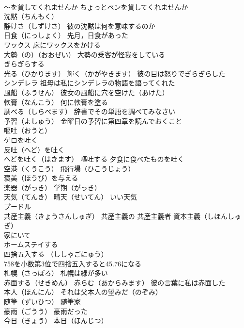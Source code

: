\documentclass[8pt]{extreport}
\begin{document}
\begin{CJK}{UTF8}{min}
\\	～を貸してくれませんか ちょっとペンを貸してくれませんか
\\	沈黙（ちんもく）
\\	静けさ（しずけさ） 彼の沈黙は何を意味するのか
\\	日食（にっしょく） 先月，日食があった
\\	ワックス 床にワックスをかける
\\	大勢（の）（おおぜい） 大勢の乗客が怪我をしている
\\	ぎらぎらする 
\\	光る（ひかります） 輝く（かがやきます） 彼の目は怒りでぎらぎらした
\\	シンデレラ 祖母は私にシンデレラの物語を語ってくれた
\\	風船（ふうせん） 彼女の風船に穴を空けた（あけた）
\\	軟膏（なんこう） 何に軟膏を塗る
\\	調べる（しらべます） 辞書でその単語を調べてみなさい
\\	予習（よしゅう） 金曜日の予習に第四章を読んでおくこと
\\	嘔吐（おうと）
\\	ゲロを吐く 
\\	反吐（へど）を吐く　
\\	へどを吐く（はきます） 嘔吐する 夕食に食べたものを吐く
\\	空港（くうこう） 飛行場（ひこうじょう）
\\	褒美（ほうび）を与える
\\	楽器（がっき） 学期（がっき） 
\\	天気（てんき） 晴天（せいてん） いい天気
\\	プードル
\\	共産主義（きょうさんしゅぎ） 共産主義の 共産主義者 資本主義（しほんしゅぎ）
\\	家にいて
\\	ホームステイする
\\	四捨五入する （ししゃごにゅう） 
\\	758を小数第3位で四捨五入すると45.76になる
\\	札幌（さっぽろ） 札幌は緑が多い
\\	赤面する（せきめん） 赤らむ（あからみます） 彼の言葉に私は赤面した
\\	本人（ほんにん） それは父本人の望みだ（のぞみ）
\\	随筆（ずいひつ） 随筆家
\\	豪雨（ごうう） 豪雨だった
\\	今日（きょう） 本日（ほんじつ）

\end{CJK}
\end{document}
